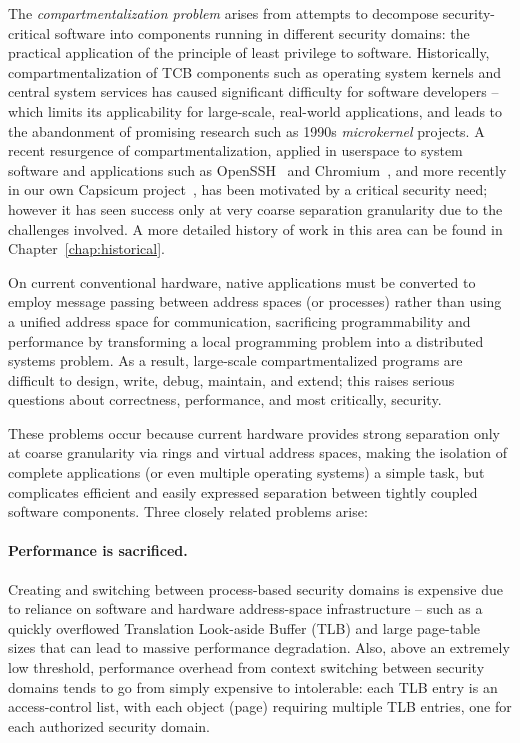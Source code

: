 The {\em compartmentalization problem} arises from attempts to decompose
security-critical software into components running in different security
domains: the practical application of the principle of least privilege to
software.
Historically, compartmentalization of TCB components such as operating system kernels
and central system services has caused significant
difficulty for software developers -- which limits its applicability for large-scale,
real-world applications, and leads to the abandonment of promising research
such as 1990s {\em microkernel} projects.
A recent resurgence of compartmentalization, applied in userspace to system software and applications
such as OpenSSH~\cite{provos:preventingprivesc} and Chromium~\cite{reis:chromium},
and more recently in our own Capsicum project~\cite{Watson10}, has been motivated by a
critical security need; however it has seen success only at very coarse separation granularity due to
the challenges involved.
A more detailed history of work in this area can be found in
Chapter~\ref{chap:historical}.

On current conventional hardware, native applications must be converted to employ message
passing between address spaces (or processes) rather than using a unified address space
for communication, sacrificing programmability and performance by transforming a local
programming problem into a distributed systems problem.
As a result, large-scale compartmentalized programs are difficult to design, write, debug,
maintain, and extend; this raises serious questions about correctness, performance, and most
critically, security.

These problems occur because current hardware provides strong separation
only at coarse granularity via rings and virtual address spaces, making
the isolation of complete applications (or even multiple operating systems)
a simple task, but complicates
efficient and easily expressed separation between tightly coupled software
components.
Three closely related problems arise:

\paragraph{Performance is sacrificed.}
Creating and switching between process-based security domains is expensive due
to reliance on software and hardware address-space infrastructure -- such as a
quickly overflowed Translation Look-aside Buffer (TLB) and large page-table
sizes that can lead to massive performance degradation.
Also, above an extremely low threshold, performance overhead from context
switching between security domains tends to go from simply expensive to
intolerable: each TLB entry is an access-control list, with each object (page)
requiring multiple TLB entries, one for each authorized security domain.

